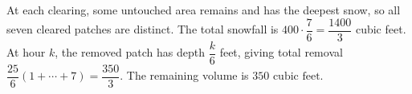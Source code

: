 At each clearing, some untouched area remains and has the deepest snow, so all seven cleared patches are distinct. The total snowfall is $400\cdot\dfrac{7}{6}=\dfrac{1400}{3}$ cubic feet. At hour $k$, the removed patch has depth $\dfrac{k}{6}$ feet, giving total removal $\dfrac{25}{6}(1+\cdots+7)=\dfrac{350}{3}$. The remaining volume is $\boxed{350\text{ cubic feet}}$.

